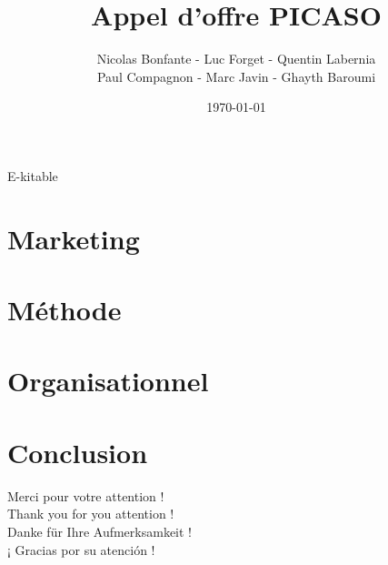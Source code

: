 \documentclass{beamer}
\title{Appel d'offre PICASO}
\author{Nicolas Bonfante - Luc Forget - Quentin Labernia \\ Paul Compagnon - Marc Javin - Ghayth Baroumi}
\institute{INSA Lyon}
\date{\today}
\begin{document}
\begin{frame}
\begin{center}
\huge E-kitable
\end{center}
\maketitle
\end{frame}


\section{Marketing}



\section{Méthode}



\section{Organisationnel}



\section{Conclusion}
\begin{frame}
\begin{center}
Merci pour votre attention ! \\
\vspace{1cm}
Thank you for you attention ! \\
\vspace{1cm}
Danke für Ihre Aufmerksamkeit ! \\
\vspace{1cm}
¡ Gracias por su atención ! \\
\end{center}
\end{frame}
\end{document}
